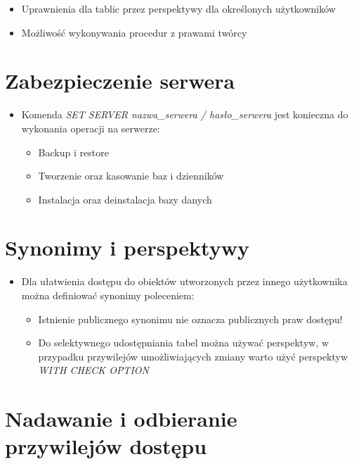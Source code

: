\documentclass[a4paper,twoside]{article}
\begin{document}
\begin{itemize}
\begin{itemize}
  			
  			\item Uprawnienia dla tablic przez perspektywy dla określonych użytkowników
  			\item Możliwość wykonywania procedur z prawami twórcy
  		\end{itemize}
  	\end{itemize}
  	
  	\section*{Zabezpieczenie serwera}
  	\begin{itemize}
  		\item Komenda \emph{SET SERVER nazwa\_serwera / hasło\_serwera} jest konieczna do wykonania operacji na serwerze:
  		\begin{itemize}
  			\item Backup i restore 
  			\item Tworzenie oraz kasowanie baz i dzienników 
  			\item Instalacja oraz deinstalacja bazy danych
  		\end{itemize}
  	\end{itemize}
  	
  	\section*{Synonimy i perspektywy}
  	\begin{itemize}
  		\item Dla ułatwienia dostępu do obiektów utworzonych przez innego użytkownika można definiować synonimy poleceniem:
  		\begin{itemize}
  			\item Istnienie publicznego synonimu nie oznacza publicznych praw dostępu! 
  			\item Do selektywnego udostępniania tabel można używać perspektyw, w przypadku przywilejów umożliwiających zmiany warto użyć perspektyw \emph{WITH CHECK OPTION}
  		\end{itemize}
  	\end{itemize}
  	
  	\section*{Nadawanie i odbieranie przywilejów dostępu}
\end{document}

